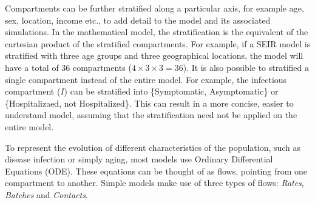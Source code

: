 Compartments can be further stratified along a particular axis, for example age, sex, location, income etc., to add detail to the model and its associated simulations. In the mathematical model, the stratification is the equivalent of the cartesian product of the stratified compartments. For example, if a SEIR model is stratified with three age groups and three geographical locations, the model will have a total of 36 compartments ($4 \times 3 \times 3 = 36$). It is also possible to stratified a single compartment instead of the entire model. For example, the infectious compartment ($I$) can be stratified into \{Symptomatic, Asymptomatic\} or \{Hospitalizaed, not Hospitalized\}. This can result in a more concise, easier to understand model, assuming that the stratification need not be applied on the entire model.

To represent the evolution of different characteristics of the population, such as disease infection or simply aging, most models use Ordinary Differential Equations (ODE)\cite{White2010}. These equations can be thought of as flows, pointing from one compartment to another. Simple models make use of three types of flows: \textit{Rates}, \textit{Batches} and \textit{Contacts}.

